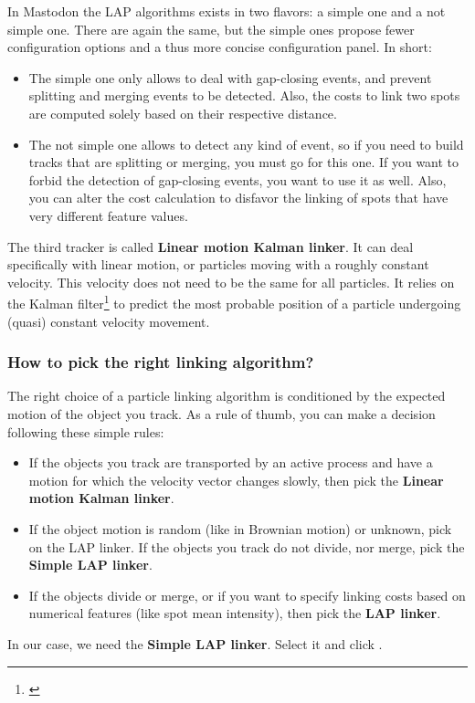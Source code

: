 In Mastodon the LAP algorithms exists in two flavors: a simple one and a not simple one. There are again the same, but the simple ones propose fewer configuration options and a thus more concise configuration panel. In short:
\begin{itemize}
    \item The simple one only allows to deal with gap-closing events, and prevent splitting and merging events to be detected. Also, the costs to link two spots are computed solely based on their respective distance.
    
    \item The not simple one allows to detect any kind of event, so if you need to build tracks that are splitting or merging, you must go for this one. If you want to forbid the detection of gap-closing events, you want to use it as well. Also, you can alter the cost calculation to disfavor the linking of spots that have very different feature values.
\end{itemize}

The third tracker is called \textbf{Linear motion Kalman linker}.
It can deal specifically with linear motion, or particles moving with a roughly constant velocity.
This velocity does not need to be the same for all particles. 
It relies on the Kalman filter\footnote{\href{https://en.wikipedia.org/wiki/Kalman_filter}{}} to predict the most probable position of a particle undergoing (quasi) constant velocity movement.

\subsubsection{How to pick the right linking algorithm?}

The right choice of a particle linking algorithm is conditioned by the expected motion of the object you track.
As a rule of thumb, you can make a decision following these simple rules:
\begin{itemize}
    
    \item If the objects you track are transported by an active process and have a motion for which the velocity vector changes slowly, then pick the  \textbf{Linear motion Kalman linker}.
    
    \item If the object motion is random (like in Brownian motion) or unknown, pick on the LAP linker. If the objects you track do not divide, nor merge, pick the \textbf{Simple LAP linker}.
    
    \item If the objects divide or merge, or if you want to specify linking costs based on numerical features (like spot mean intensity), then pick the \textbf{LAP linker}.
    
\end{itemize}
In our case, we need the \textbf{Simple LAP linker}. Select it and click .

